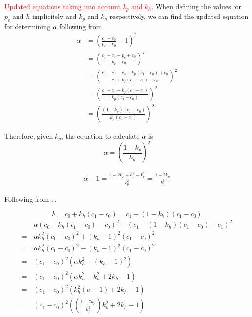 \textcolor{red}{Updated equations taking into account $k_p$ and $k_h$.}
When defining the values for $p_e$ and $h$ implicitely and $k_p$ and $k_h$ respectively, we can find the updated equation for determining $\alpha$ following from 
\begin{equation*}\begin{split}
		\alpha & = \left( \frac{c_1-c_0}{p_e-c_0} -1 \right)^2 \\
		& = \left( \frac{c_1-c_0-p_e+c_0}{p_e-c_0} \right)^2 \\
		& = \left( \frac{c_1-c_0 -c_0-k_p(c_1-c_0)+c_0}{c_0 + k_p(c_1-c_0)-c_0} \right)^2\\
		& = \left( \frac{c_1-c_0-k_p(c_1-c_0)}{k_p(c_1-c_0)} \right)^2\\
		& = \left( \frac{(1-k_p)(c_1-c_0)}{k_p(c_1-c_0)} \right)^2
\end{split}\end{equation*}

Therefore, given $k_p$, the equation to calculate $\alpha$ is
\begin{equation}
	\alpha = \left( \frac{1-k_p}{k_p} \right)^2
	\label{eq:alphafromkp}
\end{equation}

\begin{equation}\begin{split}
	\alpha-1 = \frac{1-2k_p+k_p^2-k_p^2}{k_p^2} = \frac{1-2k_p}{k_p^2}
\end{split}\end{equation}

Following from ...

\begin{equation*}
	h = c_0+k_h(c_1-c_0) = c_1-(1-k_h)(c_1-c_0)
\end{equation*}
\begin{equation*}\begin{split}
	&\alpha (c_0+k_h(c_1-c_0)-c_0)^2-(c_1-(1-k_h)(c_1-c_0)-c_1)^2\\
	=\,& \alpha k_h^2 (c_1-c_0)^2 + (k_h-1)^2(c_1-c_0)^2 \\
	=\,& \alpha k_h^2(c_1-c_0)^2-(k_h-1)^2(c_1-c_0)^2 \\
	=\,& (c_1-c_0)^2(\alpha k_h^2-(k_h-1)^2)\\
	=\,& (c_1-c_0)^2 \left( \alpha k_h^2 - k_h^2 + 2k_h - 1 \right)\\
	=\,& (c_1-c_0)^2 \left( k_h^2(\alpha-1) + 2k_h -1 \right) \\
	=\,& (c_1-c_0)^2\left( \left( \frac{1-2k_p}{k_p^2} \right)k_h^2 +2k_h -1 \right)
\end{split}\end{equation*}

